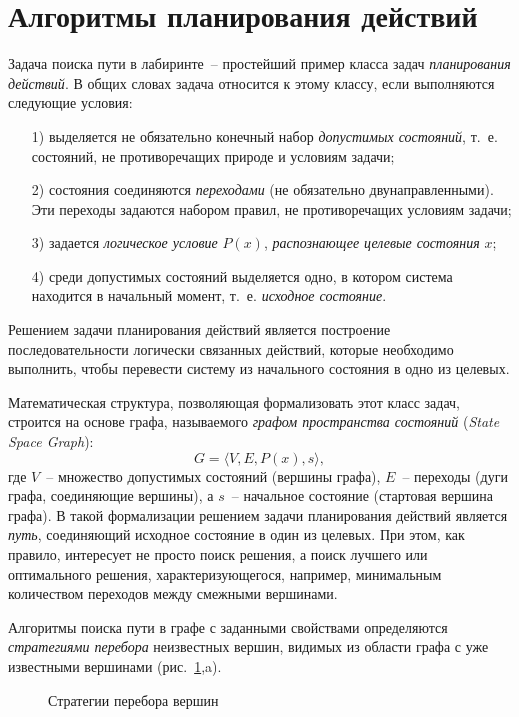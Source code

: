 \documentclass[a4paper,14pt, openany, twoside, draft]{extbook} %
\newcommand{\eeng}[1]{\emph{\foreignlanguage{english}{#1}}}
\begin{document}
\section{Алгоритмы планирования действий}
\label{sec:problemsolving}

Задача поиска пути в лабиринте~-- простейший пример класса задач \emph{планирования действий}.  В общих словах задача относится к этому классу, если выполняются следующие условия:
\begin{enumerate}
\item[1)] выделяется не обязательно конечный набор \emph{допустимых состояний}, т.~е. состояний, не противоречащих природе и условиям задачи;
\item[2)] состояния соединяются \emph{переходами} (не обязательно двунаправленными). Эти переходы задаются набором правил, не противоречащих условиям задачи;
\item[3)] задается \emph{логическое условие} $P(x)$, \emph{распознающее целевые состояния} $x$;
\item[4)] среди допустимых состояний выделяется одно, в котором система находится в начальный момент, т.~е. \emph{исходное состояние}.
\end{enumerate}
Решением задачи планирования действий является построение последовательности логически связанных действий, которые необходимо выполнить, чтобы перевести систему из начального состояния в одно из целевых.

Математическая структура, позволяющая формализовать этот класс задач, строится на основе графа, называемого \emph{графом пространства состояний} (\eeng{State Space Graph}):
$$
G=\langle V,E, P(x), s\rangle,
$$
где $V$~-- множество допустимых состояний (вершины графа), $E$~-- переходы (дуги графа, соединяющие вершины), а $s$~-- начальное состояние (стартовая вершина графа).  В такой формализации решением задачи планирования действий является \emph{путь}, соединяющий исходное состояние в один из целевых.  При этом, как правило, интересует не просто поиск решения, а поиск лучшего или оптимального решения, характеризующегося, например, минимальным количеством переходов между смежными вершинами.

Алгоритмы поиска пути в графе с заданными свойствами определяются \emph{стратегиями перебора} неизвестных вершин, видимых из области графа с уже известными вершинами (рис.~\ref{fig:searchdescr},a).
\begin{figure}[hbtp]
  \centering
  \def\svgwidth{\columnwidth}
  \footnotesize\itshape
  \def\zb{\normalsize $D$}
  \def\ya{\footnotesize\it a)}
  \def\yb{\footnotesize\it b)}
  \def\yc{\footnotesize\it c)}
  
  \caption{Стратегии перебора вершин}
  \label{fig:searchdescr}
\end{figure}
\end{document}
